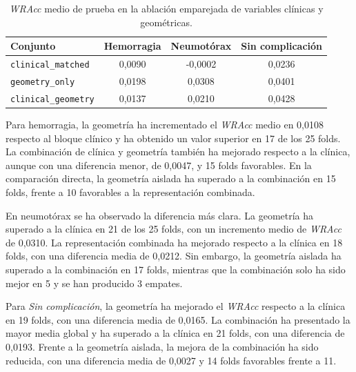 \begin{table}[!htbp]
    \centering
    \small
    \setlength{\tabcolsep}{4pt}
    \caption{\textit{WRAcc} medio de prueba en la ablación emparejada de variables clínicas y geométricas.}
    \label{tab:sd_ablacion_wracc}
    \begin{tabular}{lccc}
        \hline
        \textbf{Conjunto} &
        \textbf{Hemorragia} &
        \textbf{Neumotórax} &
        \textbf{Sin complicación} \\
        \hline
        \texttt{clinical\_matched}
        & 0,0090 & -0,0002 & 0,0236 \\

        \texttt{geometry\_only}
        & 0,0198 & 0,0308 & 0,0401 \\

        \texttt{clinical\_geometry}
        & 0,0137 & 0,0210 & 0,0428 \\
        \hline
    \end{tabular}
\end{table}


Para hemorragia, la geometría ha incrementado el \textit{WRAcc} medio en 0,0108 respecto al bloque clínico y ha obtenido un valor superior en 17 de los 25 folds. La combinación de clínica y geometría también ha mejorado respecto a la clínica, aunque con una diferencia menor, de 0,0047, y 15 folds favorables. En la comparación directa, la geometría aislada ha superado a la combinación en 15 folds, frente a 10 favorables a la representación combinada.

En neumotórax se ha observado la diferencia más clara. La geometría ha superado a la clínica en 21 de los 25 folds, con un incremento medio de \textit{WRAcc} de 0,0310. La representación combinada ha mejorado respecto a la clínica en 18 folds, con una diferencia media de 0,0212. Sin embargo, la geometría aislada ha superado a la combinación en 17 folds, mientras que la combinación solo ha sido mejor en 5 y se han producido 3 empates.

Para \textit{Sin complicación}, la geometría ha mejorado el \textit{WRAcc} respecto a la clínica en 19 folds, con una diferencia media de 0,0165. La combinación ha presentado la mayor media global y ha superado a la clínica en 21 folds, con una diferencia de 0,0193. Frente a la geometría aislada, la mejora de la combinación ha sido reducida, con una diferencia media de 0,0027 y 14 folds favorables frente a 11.


